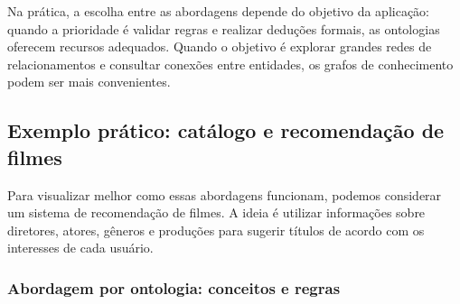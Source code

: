 \documentclass[12pt, a4paper]{article}
\begin{document}
Na prática, a escolha entre as abordagens depende do objetivo da aplicação: quando a prioridade é validar regras e realizar deduções formais, as ontologias oferecem recursos adequados. Quando o objetivo é explorar grandes redes de relacionamentos e consultar conexões entre entidades, os grafos de conhecimento podem ser mais convenientes.

\begin{table}[H]
  \centering
  \caption{Síntese comparativa entre sistemas baseados em ontologias e grafos de conhecimento}
  \label{tab:comparativo_q1}
  \renewcommand{\arraystretch}{1.25}
  \small
\end{table}

\subsection{Exemplo prático: catálogo e recomendação de filmes}

Para visualizar melhor como essas abordagens funcionam, podemos considerar um sistema de recomendação de filmes. A ideia é utilizar informações sobre diretores, atores, gêneros e produções para sugerir títulos de acordo com os interesses de cada usuário.

\subsubsection{Abordagem por ontologia: conceitos e regras}
\end{document}

